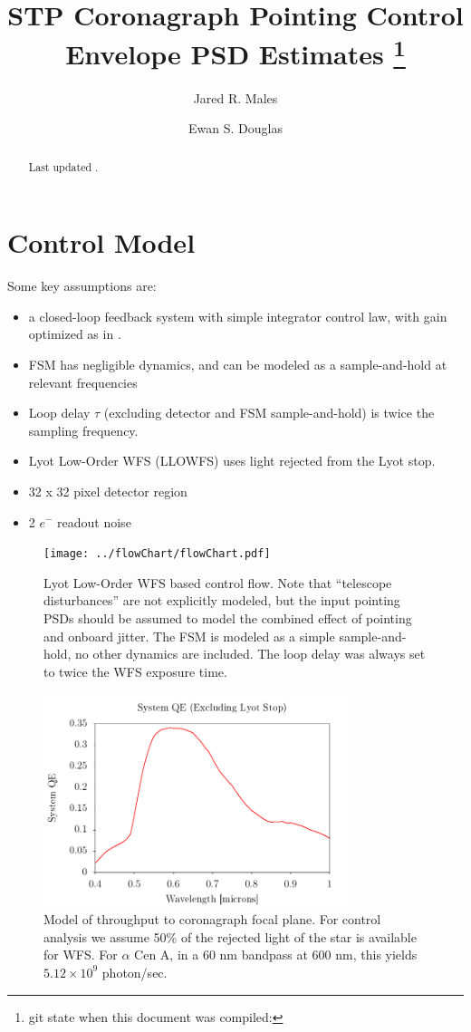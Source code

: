 \documentclass[10pt,preprint]{aastex631}
\begin{document}
\title{STP Coronagraph Pointing Control Envelope PSD Estimates \footnote{git state when this document was compiled: }}

\author{Jared R. Males}
\author{Ewan S. Douglas}

\begin{abstract}
Last updated \DTMnow.
\end{abstract}

\section{Control Model}

Some key assumptions are:
\begin{itemize}
\item a closed-loop feedback system with simple integrator control law, with gain optimized as in \citet{2018JATIS...4a9001M}. 
\item FSM has negligible dynamics, and can be modeled as a sample-and-hold at relevant frequencies
\item Loop delay $\tau$ (excluding detector and FSM sample-and-hold) is twice the sampling frequency.
\item Lyot Low-Order WFS (LLOWFS) uses light rejected from the Lyot stop.
\item 32 x 32 pixel detector region
\item 2 $e^-$ readout noise
\end{itemize}

\begin{figure}
\centering
\texttt{[image: ../flowChart/flowChart.pdf]}
\vspace{-3cm}
\caption{Lyot Low-Order WFS based control flow.  Note that ``telescope disturbances'' are not explicitly modeled, but the input pointing PSDs should be assumed to model the combined effect of pointing and onboard jitter.  The FSM is modeled as a simple sample-and-hold, no other dynamics are included.  The loop delay was always set to twice the WFS exposure time.  \label{fig:flowChart}}
\end{figure}

\begin{figure}
\centering
\includegraphics[width=3.5in]{effective_QE.pdf}
\caption{Model of throughput to coronagraph focal plane. For control analysis we assume 50\% of the rejected light of the star is available for WFS.  For $\alpha$ Cen A, in a 60 nm bandpass at 600 nm, this yields $5.12\times10^{9}$ photon/sec. \label{fig:QE}}
\end{figure}
\afterpage{\clearpage}
\end{document}
